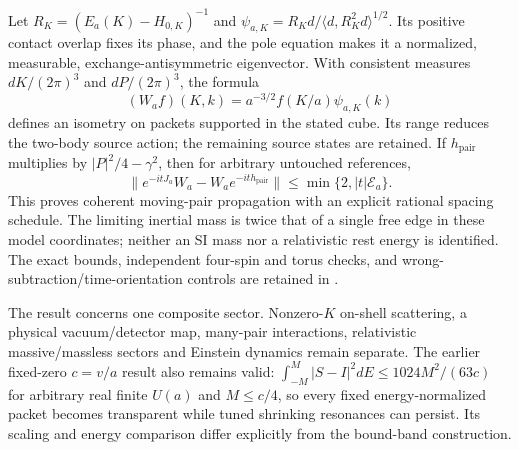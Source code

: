 Let $R_K=(E_a(K)-H_{0,K})^{-1}$ and
$\psi_{a,K}=R_Kd/\langle d,R_K^2d\rangle^{1/2}$.
Its positive contact overlap fixes its phase, and the pole equation
makes it a normalized, measurable, exchange-antisymmetric eigenvector.
With consistent measures $dK/(2\pi)^3$ and $dP/(2\pi)^3$, the formula
\[
 (W_af)(K,k)=a^{-3/2}f(K/a)\psi_{a,K}(k)
\]
defines an isometry on packets supported in the stated cube.  Its range
reduces the two-body source action; the remaining source states are
retained.  If $h_{\mathrm{pair}}$ multiplies by
$|P|^2/4-\gamma^2$, then for arbitrary untouched references,
\[
 \|e^{-itJ_a}W_a-W_ae^{-it h_{\mathrm{pair}}}\|
       \leq\min\{2,|t|\mathcal E_a\}.
\]
This proves coherent moving-pair propagation with an explicit rational
spacing schedule.  The limiting inertial mass is twice that of a single
free edge in these model coordinates; neither an SI mass nor a relativistic rest energy is
identified.  The exact bounds, independent four-spin and torus checks,
and wrong-subtraction/time-orientation controls are retained in
.

The result concerns one composite sector.  Nonzero-$K$ on-shell
scattering, a physical vacuum/detector map, many-pair interactions,
relativistic massive/massless sectors and Einstein dynamics remain
separate.  The earlier fixed-zero $c=v/a$ result also remains valid:
$\int_{-M}^{M}|S-I|^2dE\leq1024M^2/(63c)$ for arbitrary real finite
$U(a)$ and $M\leq c/4$, so every fixed energy-normalized packet becomes
transparent while tuned shrinking resonances can persist.  Its scaling
and energy comparison differ explicitly from the bound-band construction.
